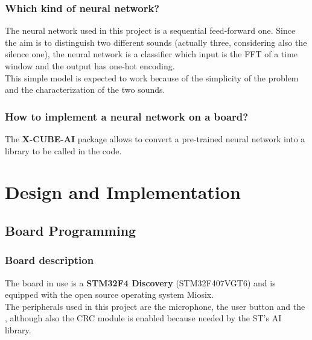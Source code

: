 \documentclass[12pt]{article}
\begin{document}
\subsubsection{Which kind of neural network?}
The neural network used in this project is a sequential feed-forward one. Since the aim is to distinguish two different sounds (actually three, considering also the silence one), the neural network is a classifier which input is the FFT of a time window and the output has one-hot encoding.\\
This simple model is expected to work because of the simplicity of the problem and the characterization of the two sounds.

\subsubsection{How to implement a neural network on a board?}
The \textbf{X-CUBE-AI} package allows to convert a pre-trained neural network into a library to be called in the code.

\section{Design and Implementation}
\subsection{Board Programming}
\subsubsection{Board description}
The board in use is a \textbf{STM32F4 Discovery} (STM32F407VGT6) and is equipped with the open source operating system Miosix.\\
The peripherals used in this project are the microphone, the user button and the , although also the CRC module is enabled because needed by the ST's AI library.
\end{document}
